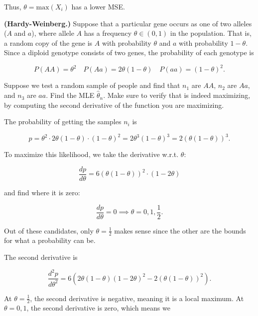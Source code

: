 \documentclass[answers]{exam}
\begin{document}
\begin{questions}
\begin{parts}
\begin{solution}
Thus, $\theta = \text{max}(X_{i})$ has a lower MSE.
\end{solution}
\end{parts}

\question[25] \textbf{(Hardy-Weinberg.)} Suppose that a particular gene occurs
as one of two alleles ($A$ and $a$), where allele $A$ has a frequency $\theta
\in (0,1)$ in the population. That is, a random copy of the gene is $A$ with
probability $\theta$ and $a$ with probability $1-\theta$. Since a diploid
genotype consists of two genes, the probability of each genotype is 

\[
P(AA) = \theta^2 \quad P(Aa) = 2\theta(1-\theta) \quad P(aa) = (1-\theta)^2
.\] 

Suppose we test a random sample of people and find that $n_1$ are $AA$, $n_2$
are $Aa$, and $n_3$ are $aa$. Find the MLE $\hat{\theta}_{n}$. Make sure to
verify that is indeed maximizing, by computing the second derivative of the
function you are maximizing.

\begin{solution}
The probability of getting the samples $n_{i}$ is

\[
p = \theta^2 \cdot 2\theta(1-\theta) \cdot (1-\theta)^2 = 2\theta^3(1-\theta)^3
= 2(\theta(1-\theta))^3
.\] 

To maximize this likelihood, we take the derivative w.r.t. $\theta$:

\[
\frac{dp}{d\theta} = 6(\theta(1-\theta))^2 \cdot (1 - 2\theta)
\] 

and find where it is zero:

\[
\frac{dp}{d\theta} = 0 \implies \theta = 0,1,\frac{1}{2}
.\] 

Out of these candidates, only $\theta = \frac{1}{2}$ makes sense since the other are 
the bounds for what a probability can be.

The second derivative is

\[
\frac{d^2p}{d\theta^2} = 6 \left( 2\theta(1-\theta)(1-2\theta)^2 - 2(\theta(1-\theta))^2 \right)
.\] 

At $\theta=\frac{1}{2}$, the second derivative is negative, meaning it is a
local maximum. At $\theta=0,1$, the second derivative is zero, which means we 
\end{solution}
\end{questions}
\end{document}
